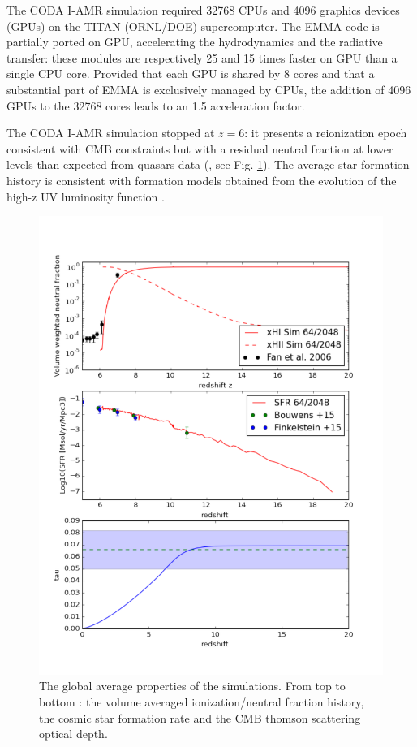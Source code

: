 \documentclass[twocolumn]{aastex61}
\begin{document}
The CODA I-AMR simulation required 32768 CPUs and 4096 graphics devices (GPUs) on the TITAN (ORNL/DOE) supercomputer. The EMMA code is partially ported on GPU, accelerating the hydrodynamics and the radiative transfer: these modules are respectively 25 and 15 times faster on GPU than a single CPU core. Provided that each GPU is shared by 8 cores and that a substantial part of EMMA is exclusively managed by CPUs, the addition of 4096 GPUs to the 32768 cores leads to an 1.5 acceleration factor. 


The CODA I-AMR simulation stopped at $z=6$: it presents a reionization epoch consistent with CMB constraints \citep{PLA15} but with a residual neutral fraction at lower levels than expected from quasars data (\citet{FAN6}, see Fig. \ref{fig:globpro}). The average star formation history is consistent with formation models obtained from the evolution of the high-z UV luminosity function \citep{BOU14,FIN15}.  

\begin{figure}[ht!]
\includegraphics[height=1.10\columnwidth, width=0.94\columnwidth]{img/x_sfr_tau.pdf}
\caption{The global average properties of the simulations. From top to bottom : the volume averaged ionization/neutral fraction history, the cosmic star formation rate and the CMB thomson scattering optical depth.}
\label{fig:globpro}
\end{figure}
\end{document}
